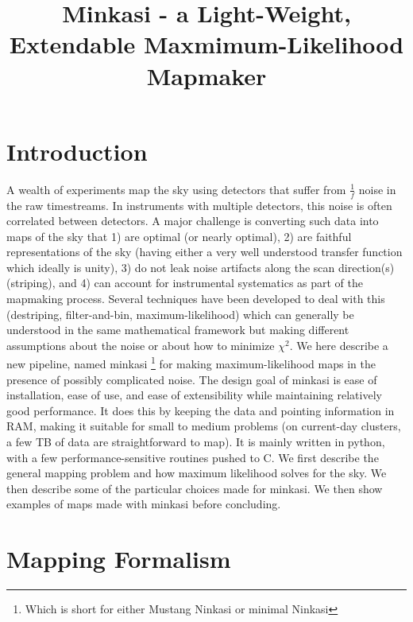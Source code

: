\documentclass[12]{article}
\begin{document}
\title{Minkasi - a Light-Weight, Extendable Maxmimum-Likelihood Mapmaker}
\section{Introduction}

A wealth of experiments map the sky using detectors that suffer from
$\frac{1}{f}$ noise in the raw timestreams.  In instruments with
multiple detectors, this noise is often correlated between detectors.
A major challenge is converting such data into maps of the sky that 1)
are optimal (or nearly optimal), 2) are faithful representations of
the sky (having either a very well understood transfer function which
ideally is unity), 3) do not leak noise artifacts along the scan
direction(s) (striping), and 4) can account for instrumental
systematics as part of the mapmaking process.  Several techniques have
been developed to deal with this (destriping, filter-and-bin,
maximum-likelihood) which can generally be understood in the same
mathematical framework but making different assumptions about the
noise or about how to minimize $\chi^2$.  We here describe a new
pipeline, named minkasi \footnote{Which is short for either Mustang
  Ninkasi or minimal Ninkasi} for making maximum-likelihood maps in
the presence of possibly complicated noise.  The design goal of
minkasi is ease of installation, ease of use, and ease of
extensibility while maintaining relatively good performance.  It does
this by keeping the data and pointing information in RAM, making it
suitable for small to medium problems (on current-day clusters, a few
TB of data are straightforward to map).  It is mainly written in
python, with a few performance-sensitive routines pushed to C.  We
first describe the general mapping problem and how maximum likelihood
solves for the sky.  We then describe some of the particular choices
made for minkasi.  We then show examples of maps made with minkasi
before concluding.

\section{Mapping Formalism}
\end{document}
